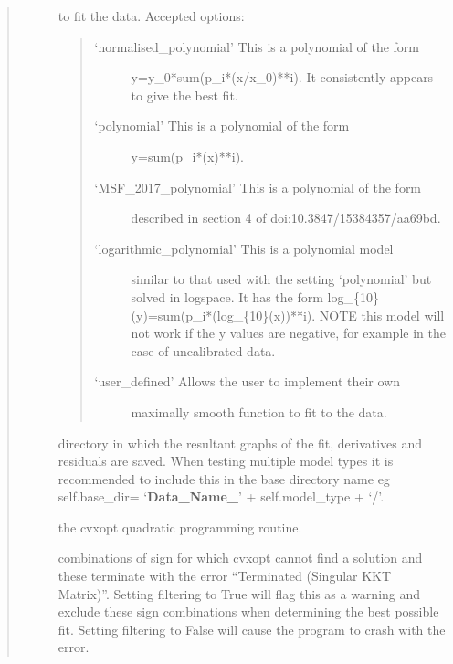 \documentclass[letterpaper,10pt,english]{sphinxmanual}
\begin{document}
\begin{fulllineitems}
\begin{quote}
\begin{description}
\begin{description}
\item[{}] \leavevmode
to fit the data.
Accepted options:
\begin{quote}
\begin{description}
\item[{‘normalised\_polynomial’ \sphinxhyphen{} This is a polynomial of the form}] \leavevmode
y=y\_0*sum(p\_i*(x/x\_0)**i). It consistently appears to give
the best fit.

\item[{‘polynomial’ \sphinxhyphen{} This is a polynomial of the form}] \leavevmode
y=sum(p\_i*(x)**i).

\item[{‘MSF\_2017\_polynomial’ \sphinxhyphen{} This is a polynomial of the form}] \leavevmode
described in section 4 of doi:10.3847/1538\sphinxhyphen{}4357/aa69bd.

\item[{‘logarithmic\_polynomial’ \sphinxhyphen{} This is a polynomial model}] \leavevmode
similar to that used with the setting ‘polynomial’ but
solved in log\sphinxhyphen{}space. It has the form
log\_\{10\}(y)=sum(p\_i*(log\_\{10\}(x))**i). NOTE this model
will not work if the y values are negative, for example in
the case of uncalibrated data.

\item[{‘user\_defined’ \sphinxhyphen{} Allows the user to implement their own}] \leavevmode
maximally smooth function to fit to the data.

\end{description}
\end{quote}

\item[{}] \leavevmode
directory in which the resultant graphs of the fit, derivatives
and residuals are saved. When testing multiple model types it is
recommended to include this in the base directory
name eg self.base\_dir= ‘{\color{red}\bfseries{}Data\_Name\_}’ + self.model\_type + ‘/’.

\item[{}] \leavevmode
the cvxopt quadratic programming routine.

\item[{}] \leavevmode
combinations of sign for which cvxopt cannot find a solution and
these terminate with the error “Terminated (Singular KKT Matrix)”.
Setting filtering to True will flag this as a warning and exclude
these sign combinations when determining the best possible fit.
Setting filtering to False will cause the program to crash with
the error.


\end{description}
\end{description}
\end{quote}
\end{fulllineitems}
\end{document}
